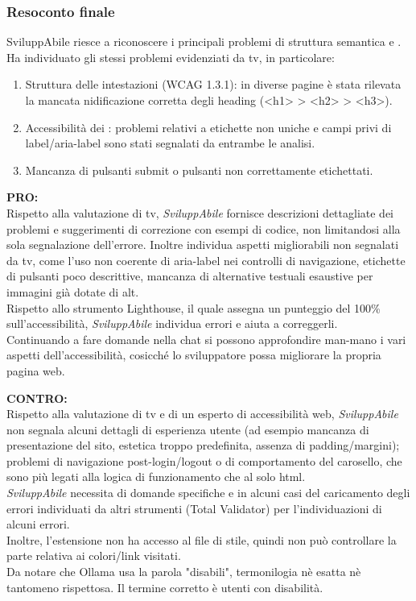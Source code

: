 \subsubsection{Resoconto finale}
\noindent SviluppAbile riesce a riconoscere i principali problemi di struttura semantica e .\\
Ha individuato gli stessi problemi evidenziati da \acrshort{tv}, in particolare:
\begin{enumerate}
    \item Struttura delle intestazioni (WCAG 1.3.1): in diverse pagine è stata rilevata la mancata nidificazione corretta degli heading (<h1> > <h2> > <h3>).
    \item Accessibilità dei : problemi relativi a etichette non uniche e campi privi di label/aria-label sono stati segnalati da entrambe le analisi.
    \item Mancanza di pulsanti submit o pulsanti non correttamente etichettati.
\end{enumerate}

\vspace{0.5cm}
\noindent \textbf{PRO:}\\
\noindent Rispetto alla valutazione di \acrshort{tv}, \textit{SviluppAbile} fornisce descrizioni dettagliate dei problemi e suggerimenti di correzione con esempi di codice, non limitandosi alla sola segnalazione dell’errore. Inoltre individua aspetti migliorabili non segnalati da \acrshort{tv}, come l’uso non coerente di aria-label nei controlli di navigazione, etichette di pulsanti poco descrittive, mancanza di alternative testuali esaustive per immagini già dotate di alt.\\
Rispetto allo strumento Lighthouse, il quale assegna un punteggio del 100\% sull'accessibilità, \textit{SviluppAbile} individua errori e aiuta a correggerli.\\
Continuando a fare domande nella chat si possono approfondire man-mano i vari aspetti dell’accessibilità, cosicché lo sviluppatore possa migliorare la propria pagina web.

\vspace{0.5cm}
\noindent \textbf{CONTRO:}\\
\noindent Rispetto alla valutazione di \acrshort{tv} e di un esperto di accessibilità web, \textit{SviluppAbile} non segnala alcuni dettagli di esperienza utente (ad esempio mancanza di presentazione del sito, estetica troppo predefinita, assenza di padding/margini); problemi di navigazione post-login/logout o di comportamento del carosello, che sono più legati alla logica di funzionamento che al solo \acrshort{html}.\\
\textit{SviluppAbile} necessita di domande specifiche e in alcuni casi del caricamento degli errori individuati da altri strumenti (Total Validator) per l’individuazioni di alcuni errori.\\
Inoltre, l'estensione non ha accesso al file di stile, quindi non può controllare la parte relativa ai colori/link visitati.\\
Da notare che Ollama usa la parola "disabili", termonilogia nè esatta nè tantomeno rispettosa. Il termine corretto è utenti con disabilità.

